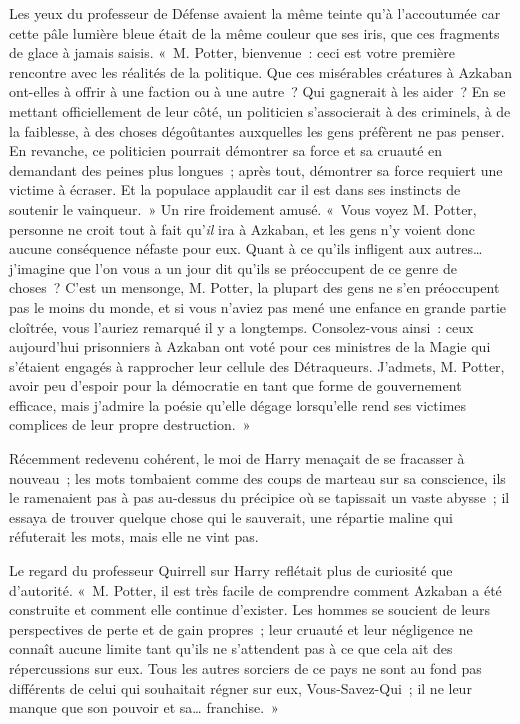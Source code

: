 Les yeux du professeur de Défense avaient la même teinte qu'à l'accoutumée car cette pâle lumière bleue était de la même couleur que ses iris, que ces fragments de glace à jamais saisis. «~M. Potter, bienvenue~: ceci est votre première rencontre avec les réalités de la politique. Que ces misérables créatures à Azkaban ont-elles à offrir à une faction ou à une autre~? Qui gagnerait à les aider~? En se mettant officiellement de leur côté, un politicien s'associerait à des criminels, à de la faiblesse, à des choses dégoûtantes auxquelles les gens préfèrent ne pas penser. En revanche, ce politicien pourrait démontrer sa force et sa cruauté en demandant des peines plus longues~; après tout, démontrer sa force requiert une victime à écraser. Et la populace applaudit car il est dans ses instincts de soutenir le vainqueur.~» Un rire froidement amusé. «~Vous voyez M. Potter, personne ne croit tout à fait qu'\emph{il} ira à Azkaban, et les gens n'y voient donc aucune conséquence néfaste pour eux. Quant à ce qu'ils infligent aux autres… j'imagine que l'on vous a un jour dit qu'ils se préoccupent de ce genre de choses~? C'est un mensonge, M. Potter, la plupart des gens ne s'en préoccupent pas le moins du monde, et si vous n'aviez pas mené une enfance en grande partie cloîtrée, vous l'auriez remarqué il y a longtemps. Consolez-vous ainsi~: ceux aujourd'hui prisonniers à Azkaban ont voté pour ces ministres de la Magie qui s'étaient engagés à rapprocher leur cellule des Détraqueurs. J'admets, M. Potter, avoir peu d'espoir pour la démocratie en tant que forme de gouvernement efficace, mais j'admire la poésie qu'elle dégage lorsqu'elle rend ses victimes complices de leur propre destruction.~»

Récemment redevenu cohérent, le moi de Harry menaçait de se fracasser à nouveau~; les mots tombaient comme des coups de marteau sur sa conscience, ils le ramenaient pas à pas au-dessus du précipice où se tapissait un vaste abysse~; il essaya de trouver quelque chose qui le sauverait, une répartie maline qui réfuterait les mots, mais elle ne vint pas.

Le regard du professeur Quirrell sur Harry reflétait plus de curiosité que d'autorité. «~M. Potter, il est très facile de comprendre comment Azkaban a été construite et comment elle continue d'exister. Les hommes se soucient de leurs perspectives de perte et de gain propres~; leur cruauté et leur négligence ne connaît aucune limite tant qu'ils ne s'attendent pas à ce que cela ait des répercussions sur eux. Tous les autres sorciers de ce pays ne sont au fond pas différents de celui qui souhaitait régner sur eux, Vous-Savez-Qui~; il ne leur manque que son pouvoir et sa… franchise.~»


